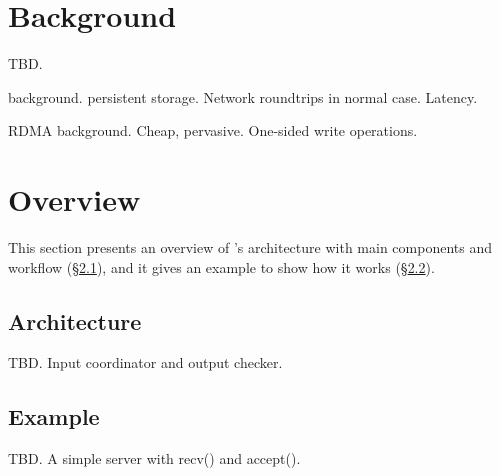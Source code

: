 \section{\xxx Background}\label{sec:background}

TBD.

\paxos background.
persistent storage. 
Network roundtrips in normal case. Latency.

RDMA background.
Cheap, pervasive.
One-sided write operations.


\section{\xxx Overview}\label{sec:overview}

This section presents an overview of \xxx's architecture with main 
components and workflow (\S\ref{sec:arch}), and it gives an example to show how 
it works (\S\ref{sec:example}).



\subsection{Architecture}\label{sec:arch}

TBD. Input coordinator and output checker.

\subsection{Example}\label{sec:example}

TBD. A simple server with recv() and accept().